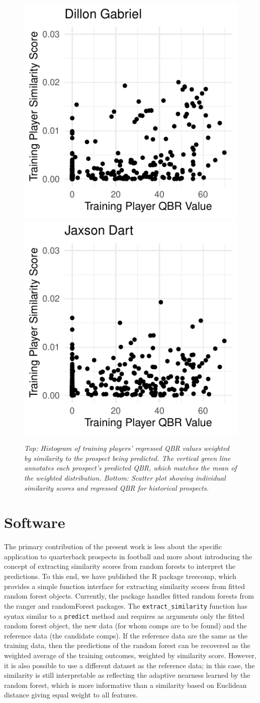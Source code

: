 \documentclass{article}
\begin{document}
\begin{figure}[h]
    \includegraphics[width=0.24\linewidth]{figures/prospect_similarity_gabriel.pdf}
    \includegraphics[width=0.24\linewidth]{figures/prospect_similarity_dart.pdf}
    \caption{\it Top: Histogram of training players' regressed QBR values weighted by similarity to the prospect being predicted. The vertical green line annotates each prospect's predicted QBR, which matches the mean of the weighted distribution. Bottom: Scatter plot showing individual similarity scores and regressed QBR for historical prospects.}
    \label{fig:prospect-plots}
\end{figure}

\section{Software}
\label{sec:software}

The primary contribution of the present work is less about the specific application to quarterback prospects in football and more about introducing the concept of extracting similarity scores from random forests to interpret the predictions. To this end, we have published the R package treecomp, which provides a simple function interface for extracting similarity scores from fitted random forest objects. Currently, the package handles fitted random forests from the ranger and randomForest packages. The \texttt{extract\_similarity} function has syntax similar to a \texttt{predict} method and requires as arguments only the fitted random forest object, the new data (for whom comps are to be found) and the reference data (the candidate comps). If the reference data are the same as the training data, then the predictions of the random forest can be recovered as the weighted average of the training outcomes, weighted by similarity score. However, it is also possible to use a different dataset as the reference data; in this case, the similarity is still interpretable as reflecting the adaptive nearness learned by the random forest, which is more informative than a similarity based on Euclidean distance giving equal weight to all features.
\end{document}
